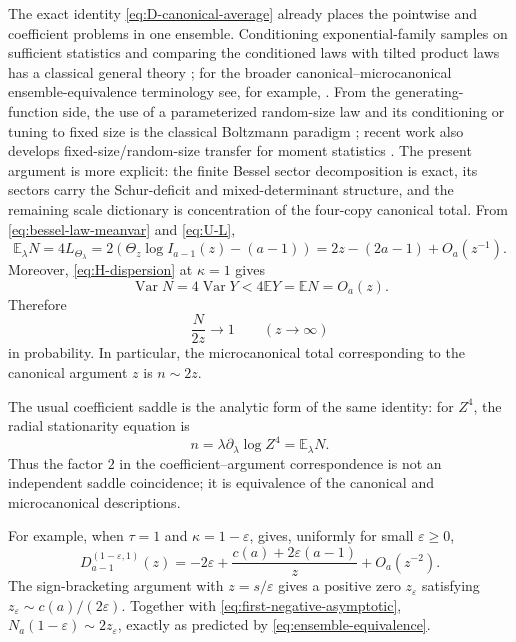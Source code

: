 \documentclass[11pt,a4paper]{amsart}
\numberwithin{equation}{section}
\theoremstyle{plain}
\theoremstyle{definition}
\newcommand{\E}{\mathbb E}
\newcommand{\Thetal}{\Theta_{\lambda}}
\newcommand{\Thetaz}{\Theta_z}
\begin{document}
The exact identity \eqref{eq:D-canonical-average} already places the pointwise
and coefficient problems in one ensemble.  Conditioning exponential-family
samples on sufficient statistics and comparing the conditioned laws with
tilted product laws has a classical general theory
\cite{DiaconisFreedman1988Conditional}; for the broader canonical--microcanonical
ensemble-equivalence terminology see, for example,
\cite{Touchette2015Ensembles}.  From the generating-function side, the use of
a parameterized random-size law and its conditioning or tuning to fixed size is
the classical Boltzmann paradigm \cite{Duchon2004Boltzmann}; recent work
also develops fixed-size/random-size transfer for moment statistics
\cite{Nebel2026BoltzmannMoments}.  The present argument is more explicit: the
finite Bessel sector decomposition is exact, its sectors carry the
Schur-deficit and mixed-determinant structure, and the remaining scale
dictionary is concentration of the four-copy canonical total.  From
\eqref{eq:bessel-law-meanvar} and \eqref{eq:U-L},
\begin{equation}\label{eq:N-mean}
 \E_\lambda N=4L_{\Thetal}
 =2(\Thetaz\log I_{a-1}(z)-(a-1))
 =2z-(2a-1)+O_a(z^{-1}).
\end{equation}
Moreover, \eqref{eq:H-dispersion} at \(\kappa=1\) gives
\[
 \operatorname{Var}N=4\operatorname{Var}Y<4\E Y=\E N=O_a(z).
\]
Therefore
\begin{equation}\label{eq:ensemble-equivalence}
 \frac{N}{2z}\longrightarrow1
 \qquad(z\to\infty)
\end{equation}
in probability.  In particular, the microcanonical total corresponding to the
canonical argument \(z\) is \(n\sim2z\).

The usual coefficient saddle is the analytic form of the same identity:
for \(Z^4\), the radial stationarity equation is
\[
 n=\lambda\partial_\lambda\log Z^4=\E_\lambda N.
\]
Thus the factor \(2\) in the coefficient--argument correspondence is not an
independent saddle coincidence; it is equivalence of the canonical and
microcanonical descriptions.

For example, when \(\tau=1\) and \(\kappa=1-\varepsilon\),
 gives, uniformly for small \(\varepsilon\ge0\),
\[
 D_{a-1}^{(1-\varepsilon,1)}(z)
 =-2\varepsilon+\frac{c(a)+2\varepsilon(a-1)}z+O_a(z^{-2}).
\]
The sign-bracketing argument with \(z=s/\varepsilon\) gives a positive zero
\(z_\varepsilon\) satisfying \(z_\varepsilon\sim c(a)/(2\varepsilon)\).
Together with \eqref{eq:first-negative-asymptotic},
\(N_a(1-\varepsilon)\sim2z_\varepsilon\),
exactly as predicted by \eqref{eq:ensemble-equivalence}.
\end{document}
